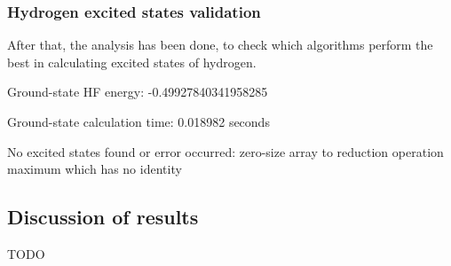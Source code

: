 
\subsubsection{Hydrogen excited states validation}

After that, the analysis has been done, to check which algorithms perform the best in calculating excited states of hydrogen. 








Ground-state HF energy: -0.49927840341958285

Ground-state calculation time: 0.018982 seconds

No excited states found or error occurred: zero-size array to reduction operation maximum which has no identity

\subsection{Discussion of results}
TODO
